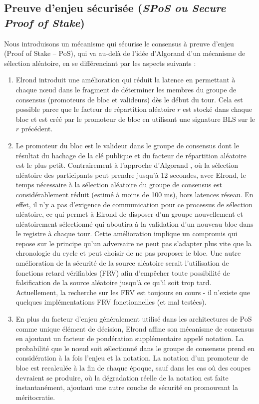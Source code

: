 \documentclass[journal]{IEEEtran}
\begin{document}
\subsection{Preuve d'enjeu sécurisée (\textit{SPoS ou Secure Proof of Stake})}
Nous introduisons un mécanisme qui sécurise le consensus à preuve d’enjeu (Proof of Stake – PoS), qui va au-delà de l'idée d'Algorand \cite{3} d'un mécanisme de sélection aléatoire, en se différenciant par les aspects suivants :
\begin{enumerate}
  \item  Elrond introduit une amélioration qui réduit la latence en permettant à chaque nœud dans le fragment de déterminer les membres du groupe de consensus (promoteurs de bloc et valideurs) dès le début du tour. Cela est possible parce que le facteur de répartition aléatoire $r$ est stocké dans chaque bloc et est créé par le promoteur de bloc en utilisant une signature BLS \cite{4} sur le $r$ précédent.
  \item Le promoteur du bloc est le valideur dans le groupe de consensus dont le résultat du hachage de la clé publique et du facteur de répartition aléatoire est le plus petit. Contrairement à l'approche d'Algorand \cite{3}, où la sélection aléatoire des participants peut prendre jusqu'à 12 secondes, avec Elrond, le temps nécessaire à la sélection aléatoire du groupe de consensus est considérablement réduit (estimé à moins de 100 ms), hors latences réseau. En effet, il n'y a pas d'exigence de communication pour ce processus de sélection aléatoire, ce qui permet à Elrond de disposer d’un groupe nouvellement et aléatoirement sélectionné qui aboutira à la validation d’un nouveau bloc dans le registre à chaque tour.
Cette amélioration implique un compromis qui  repose sur le principe qu'un adversaire ne peut pas s'adapter plus vite que la chronologie du cycle et peut choisir de ne pas proposer le bloc. Une autre amélioration de la sécurité de la source aléatoire serait l'utilisation de fonctions retard vérifiables (FRV) afin d'empêcher toute possibilité de falsification de la source aléatoire jusqu'à ce qu'il soit trop tard. Actuellement, la recherche sur les FRV est toujours en cours - il n'existe que quelques implémentations FRV fonctionnelles (et mal testées).
  \item  En plus du facteur d’enjeu généralement utilisé dans les architectures de PoS comme unique élément de décision, Elrond affine son mécanisme de consensus en ajoutant un facteur de pondération supplémentaire appelé notation. La probabilité que le nœud soit sélectionné dans le groupe de consensus prend en considération à la fois l'enjeu et la notation. La notation d'un promoteur de bloc est recalculée à la fin de chaque époque, sauf dans les cas où des coupes devraient se produire, où la dégradation réelle de la notation est faite instantanément, ajoutant une autre couche de sécurité en promouvant la méritocratie.

\end{enumerate}
\end{document}
